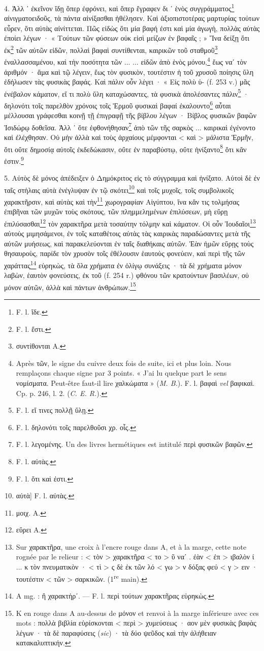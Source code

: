 \documentclass[a4paper, 11pt, oneside, polutonikogreek, french]{article}
\begin{document}
4. Ἀλλ ᾽ ἐκεῖνον ἴδῃ ὅπερ ἐφρόνει, καὶ ὅπερ ἔγραφεν δι ᾽ ἑνὸς συγγράμματος\footnote{F. l. ἴδε.} αἰνιγματοειδοῦς, τὰ πάντα αἰνίξασθαι ἠθέλησεν. Καὶ ἀξιοπιστοτέρας μαρτυρίας τούτων εὗρεν, ὅτι αὐτὰς αἰνίττεται. Πῶς εἰδὼς ὅτι μία βαφή ἐστι καὶ μία ἀγωγὴ, πολλὰς αὐτὰς ἐποίει λέγων · « Τούτων τῶν φύσεων οὐκ εἰσὶ μείζων ἐν βαφαῖς ; » Ἵνα δείξῃ ὅτι ἐκ\footnote{F. l. ἔστι.} τῶν αὐτῶν εἰδῶν, πολλαὶ βαφαὶ συντίθενται, καιρικῶν τοῦ σταθμοῦ\footnote{συντίθονται A.} ἐναλλασσαμένου, καὶ τὴν ποσότητα τῶν ... ... εἰδῶν ἀπὸ ἑνὸς μόνου,\footnote{Après τῶν, le signe du cuivre deux fois de suite, ici et plus loin. Nous remplaçons chaque signe par 3 points. « J'ai lu quelque part le sens νομίσματα. Peut-être faut-il lire χαλκώματα » (\emph{M. B.}). F. l. βαφαὶ \emph{vel} βαφικαὶ. Cp. p. 246, l. 2. (\emph{C. E. R.}).} ἕως ναʹ τὸν ἀριθμόν · ἅμα καὶ τῷ λέγειν, ἕως τὸν φυσικὸν, τουτέστιν ἡ τοῦ χρυσοῦ ποίησις ὕλη ἐδήλωσεν τὰς φυσικὰς βαφάς. Καὶ πάλιν οὖν λέγει · « Εἰς πολὺ ὑ- (f. 253 v.) μᾶς ἐνέβαλον κάματον, εἴ τι πολὺ ὕλη καταχώσαντες, τὰ φυσικὰ ἀπολέσαντες πάλιν\footnote{F. l. εἴ τινες πολλῇ ὕλῃ.} · δηλονότι τοῖς παρελθὸν χρόνοις τοῖς Ἑρμοῦ φυσικαὶ βαφαί ἐκαλουντο\footnote{F. l. δηλονότι τοῖς παρελθοῦσι χρ. οἷς.} αὗται μέλλουσαι γράφεσθαι κοινῇ τῇ ἐπιγραφῇ τῆς βίβλου λέγων · Βίβλος φυσικῶν βαφῶν Ἰσιδώρῳ δοθεῖσα. Ἀλλ ᾽ ὅτε ἐφθονήθησαν\footnote{F. l. λεγομένης. Un des livres hermétiques est intitulé περὶ φυσικῶν βαφῶν.} ἀπὸ τῶν τῆς σαρκὸς ... καιρικαὶ ἐγένοντο καὶ ἐλέχθησαν. Οὐ μὴν ἀλλὰ καὶ τοὺς ἀρχαίους μέμφονται < καὶ > μάλιστα Ἑρμῆν, ὅτι οὔτε δημοσίᾳ αὐτοῖς ἐκδεδώκασιν, οὔτε ἐν παραβύστῳ, οὔτε ἡνίξαντο\footnote{F. l. αὐτὰς.} ὅτι κἄν ἐστιν.\footnote{F. l. ὅτι καὶ ἐστι.}

5. Αὐτὸς δὲ μόνος ἀπέδειξεν ὁ Δημόκριτος εἰς τὸ σύγγραμμα καὶ ἠνίξατο. Αὐτοὶ δὲ ἐν ταῖς στήλαις αὐτὰ ἐνέγλυψαν ἐν τῷ σκότει\footnote{αὐτὰ] F. l. αὐτὰς.} καὶ τοῖς μυχοῖς, τοῖς συμβολικοῖς χαρακτῆρσιν, καὶ αὐτὰς καὶ τὴν\footnote{μοιχ. A.} χωρογραφίαν Αἰγύπτου, ἵνα κἄν τις τολμήσας ἐπιβῆναι τῶν μυχῶν τοὺς σκότους, τῶν πλημμελημένων ἐπιλύσεων, μὴ εὕρῃ ἐπιλύσασθαι\footnote{εὕρει A.} τὸν χαρακτῆρα μετὰ τοσαύτην τόλμην καὶ κάματον. Οἱ οὖν Ἰουδαῖοι\footnote{Sur χαρακτῆρα, une croix à l'encre rouge dans A, et à la marge, cette note rognée par le relieur : < τὸν > χαρακτῆρα < το > ῦ ναʹ . ἐὰν < ἐπ > ιβαλὸν ί ... κ τὸν πνευματικὸν · < τὶ > ς δὲ ἐκ τῶν λό < γω > ν δόξας φεύ < γ > ειν · τουτέστιν < τῶν > σαρκικῶν. (1\textsuperscript{re} main).} αὐτοὺς μιμησάμενοι, ἐν τοῖς καταθέτοις αὐτὰς τὰς καιρικὰς παραδώσαντες μετὰ τῆς αὐτῶν μυήσεως, καὶ παρακελεύονται ἐν ταῖς διαθήκαις αὐτῶν. Ἐὰν ἡμῶν εὕρῃς τοὺς θησαυροὺς, παρίδε τὸν χρυσὸν τοῖς ἐθέλουσιν ἑαυτοὺς φονεύειν, καὶ περὶ τῆς τῶν χαράττας\footnote{A mg. : ἢ χαρακτήρʹ. --- F. l. περὶ τούτων χαρακτῆρας εὑρηκὼς.} εὑρηκὼς, τὰ ὅλα χρήματα ἐν ὀλίγῳ συνάξεις · τὰ δὲ χρήματα μόνον λαβὼν, ἑαυτὸν φονεύσεις, ἐκ τοῦ (f. 254 r.) φθόνου τῶν κρατούντων βασιλέων, οὐ μόνον αὐτῶν, ἀλλὰ καὶ πάντων ἀνθρώπων.\footnote{K en rouge dans A au-dessus de μόνον et renvoi à la marge inférieure avec ces mots : πολλὰ βιβλία εὑρίσκονται < περὶ > χυμεύσεως · αον μὲν φυσικὰς βαφὰς λέγων · τὰ δὲ παραφύσεις (\emph{sic}) · τὰ δύο ψεῦδος καὶ τὴν ἀλήθειαν κατακαλυπτικήν.}
\end{document}
